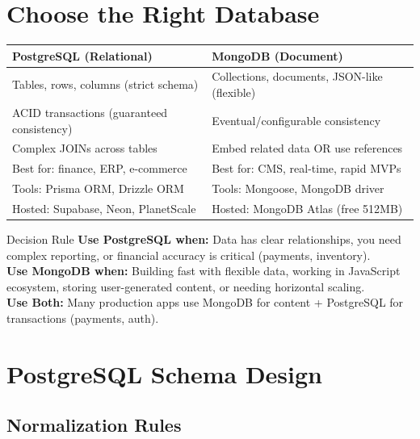 \documentclass[12pt,a4paper]{article}
\begin{document}
\section{Choose the Right Database}

\begin{center}
\begin{tabularx}{\textwidth}{|X|X|}
\hline
\rowcolor{FaranDark}
\color{white}\large\textbf{PostgreSQL (Relational)} & \color{white}\large\textbf{MongoDB (Document)} \\
\hline
Tables, rows, columns (strict schema) & Collections, documents, JSON-like (flexible) \\
\hline
\rowcolor{SectionBg}
ACID transactions (guaranteed consistency) & Eventual/configurable consistency \\
\hline
Complex JOINs across tables & Embed related data OR use references \\
\hline
\rowcolor{SectionBg}
Best for: finance, ERP, e-commerce & Best for: CMS, real-time, rapid MVPs \\
\hline
Tools: Prisma ORM, Drizzle ORM & Tools: Mongoose, MongoDB driver \\
\hline
\rowcolor{SectionBg}
Hosted: Supabase, Neon, PlanetScale & Hosted: MongoDB Atlas (free 512MB) \\
\hline
\end{tabularx}
\end{center}

\begin{infobox}{Decision Rule}
\textbf{Use PostgreSQL when:} Data has clear relationships, you need complex reporting, or financial accuracy is critical (payments, inventory).\\[0.2cm]
\textbf{Use MongoDB when:} Building fast with flexible data, working in JavaScript ecosystem, storing user-generated content, or needing horizontal scaling.\\[0.2cm]
\textbf{Use Both:} Many production apps use MongoDB for content + PostgreSQL for transactions (payments, auth).
\end{infobox}

\newpage

\section{PostgreSQL Schema Design}

\subsection{Normalization Rules}
\end{document}
